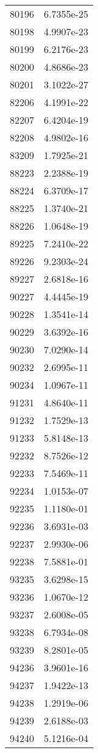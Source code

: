 \begin{table}[h!]
\begin{tabular}{|| c || c |}
80196 & 6.7355e-25 \\
80198 & 4.9907e-23 \\
80199 & 6.2176e-23 \\
80200 & 4.8686e-23 \\
80201 & 3.1022e-27 \\
82206 & 4.1991e-22 \\
82207 & 6.4204e-19 \\
82208 & 4.9802e-16 \\
83209 & 1.7925e-21 \\
88223 & 2.2388e-19 \\
88224 & 6.3709e-17 \\
88225 & 1.3740e-21 \\
88226 & 1.0648e-19 \\
89225 & 7.2410e-22 \\
89226 & 9.2303e-24 \\
89227 & 2.6818e-16 \\
90227 & 4.4445e-19 \\
90228 & 1.3541e-14 \\
90229 & 3.6392e-16 \\
90230 & 7.0290e-14 \\
90232 & 2.6995e-11 \\
90234 & 1.0967e-11 \\
91231 & 4.8640e-11 \\
91232 & 1.7529e-13 \\
91233 & 5.8148e-13 \\
92232 & 8.7526e-12 \\
92233 & 7.5469e-11 \\
92234 & 1.0153e-07 \\
92235 & 1.1180e-01 \\
92236 & 3.6931e-03 \\
92237 & 2.9930e-06 \\
92238 & 7.5881e-01 \\
93235 & 3.6298e-15 \\
93236 & 1.0670e-12 \\
93237 & 2.6008e-05 \\
93238 & 6.7934e-08 \\
93239 & 8.2801e-05 \\
94236 & 3.9601e-16 \\
94237 & 1.9422e-13 \\
94238 & 1.2919e-06 \\
94239 & 2.6188e-03 \\
94240 & 5.1216e-04 \\

\end{tabular}
\end{table}
